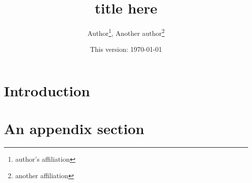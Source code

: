 \documentclass[11pt]{article}
\title{title here}
\author{Author\thanks{author's affiliation}, Another author\thanks{another affiliation}}
\date{This version: \today
}
\begin{document}

\maketitle

\begin{abstract}
\end{abstract}

\clearpage

\section{Introduction}\label{s:introduction}



\cleardoublepage



\cleardoublepage
\appendix
\noappendicestocpagenum \addappheadtotoc
\makeatletter
\def\@seccntformat#1{Appendix\ \csname the#1\endcsname\quad}
\def\@subseccntformat#1{\csname the#1\endcsname\quad}
\makeatother
\setcounter{table}{0} \setcounter{figure}{0}
\renewcommand\thetable{\Alph{section}.\arabic{table}}
\renewcommand\thefigure{\Alph{section}.\arabic{figure}}


\clearpage 
\section{An appendix section}\label{s:appendix_section}



\end{document}
